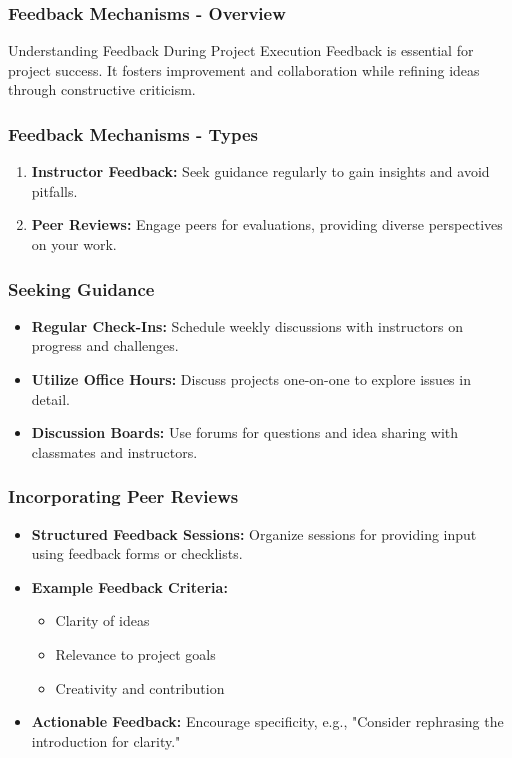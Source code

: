 \documentclass{beamer}
\begin{document}
\begin{frame}[fragile]
    \frametitle{Feedback Mechanisms - Overview}
    \begin{block}{Understanding Feedback During Project Execution}
        Feedback is essential for project success. It fosters improvement and collaboration while refining ideas through constructive criticism. 
    \end{block}
\end{frame}

\begin{frame}[fragile]
    \frametitle{Feedback Mechanisms - Types}
    \begin{enumerate}
        \item \textbf{Instructor Feedback:} Seek guidance regularly to gain insights and avoid pitfalls.
        \item \textbf{Peer Reviews:} Engage peers for evaluations, providing diverse perspectives on your work.
    \end{enumerate}
\end{frame}

\begin{frame}[fragile]
    \frametitle{Seeking Guidance}
    \begin{itemize}
        \item \textbf{Regular Check-Ins:} Schedule weekly discussions with instructors on progress and challenges.
        \item \textbf{Utilize Office Hours:} Discuss projects one-on-one to explore issues in detail.
        \item \textbf{Discussion Boards:} Use forums for questions and idea sharing with classmates and instructors.
    \end{itemize}
\end{frame}

\begin{frame}[fragile]
    \frametitle{Incorporating Peer Reviews}
    \begin{itemize}
        \item \textbf{Structured Feedback Sessions:} Organize sessions for providing input using feedback forms or checklists.
        \item \textbf{Example Feedback Criteria:}
            \begin{itemize}
                \item Clarity of ideas
                \item Relevance to project goals
                \item Creativity and contribution
            \end{itemize}
        \item \textbf{Actionable Feedback:} Encourage specificity, e.g., "Consider rephrasing the introduction for clarity."
    \end{itemize}
\end{frame}
\end{document}
